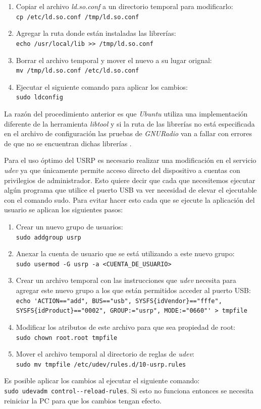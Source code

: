 \begin{enumerate}
  \item Copiar el archivo \emph{ld.so.conf} a un directorio temporal para
  modificarlo:\\
  \verb|cp /etc/ld.so.conf /tmp/ld.so.conf|
  \item Agregar la ruta donde est\'an instaladas las librer\'ias:\\
  \verb|echo /usr/local/lib >> /tmp/ld.so.conf|
  \item Borrar el archivo temporal y mover el nuevo a su lugar orignal:\\
  \verb|mv /tmp/ld.so.conf /etc/ld.so.conf|
  \item Ejecutar el siguiente comando para aplicar los cambios:\\
  \verb|sudo ldconfig|
\end{enumerate}

La raz\'on del procedimiento anterior es que \emph{Ubuntu} utiliza una
implementaci\'on diferente de la herramienta \emph{libtool} y si la ruta de las
librer\'ias no est\'a especificada en el archivo de configuraci\'on las pruebas
de \emph{GNURadio} van a fallar con errores de que no se encuentran dichas
librer\'ias \cite{radio}.


Para el uso \'optimo del USRP es necesario realizar una modificaci\'on en el
servicio \emph{udev} ya que \'unicamente permite acceso directo del dispositivo
a cuentas con privilegios de administrador. Esto quiere decir que cada que
necesitemos ejecutar alg\'un programa que utilice el puerto USB va ver necesidad
de elevar el ejecutable con el comando sudo. Para evitar hacer esto cada que se
ejecute la aplicaci\'on del usuario se aplican los siguientes pasos:

\begin{enumerate}
  \item Crear un nuevo grupo de usuarios:\\
  \verb|sudo addgroup usrp|
  \item Anexar la cuenta de usuario que se est\'a utilizando a este nuevo
  grupo:\\
  \verb|sudo usermod -G usrp -a <CUENTA_DE_USUARIO>|
  \item Crear un archivo temporal con las instrucciones que \emph{udev} necesita
  para agregar este nuevo grupo a los que est\'an permitidos acceder al puerto
  USB:\\
  \verb|echo 'ACTION=="add", BUS=="usb", SYSFS{idVendor}=="fffe",|\\
  \verb|SYSFS{idProduct}=="0002", GROUP:="usrp", MODE:="0660"' > tmpfile|
  \item Modificar los atributos de este archivo para que sea propiedad de root:\\
  \verb|sudo chown root.root tmpfile|
  \item Mover el archivo temporal al directorio de reglas de \emph{udev}:\\
  \verb|sudo mv tmpfile /etc/udev/rules.d/10-usrp.rules|
\end{enumerate}

Es posible aplicar los cambios al ejecutar el siguiente comando:\\
\verb|sudo udevadm control--reload-rules|. Si esto no funciona entonces se necesita reiniciar la PC
para que los cambios tengan efecto.
